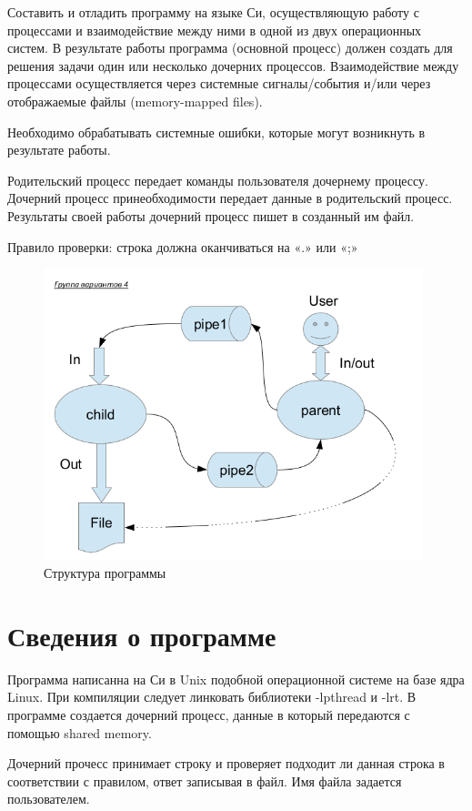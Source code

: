\documentclass[pdf, unicode, 12pt, a4paper,oneside,fleqn]{article}
\begin{document}
Составить и отладить программу на языке Си, осуществляющую работу с процессами 
и взаимодействие между ними в одной из двух операционных систем. В результате работы 
программа (основной процесс) должен создать для решения задачи один или несколько 
дочерних процессов. Взаимодействие между процессами осуществляется через системные 
сигналы/события и/или через отображаемые файлы (memory-mapped files).

Необходимо обрабатывать системные ошибки, которые могут возникнуть в результате работы.

Родительский процесс передает команды пользователя дочернему процессу. Дочерний процесс 
принеобходимости передает данные в родительский процесс. Результаты своей работы дочерний
процесс пишет в созданный им файл.

Правило проверки: строка должна оканчиваться на «.» или «;»

\begin{figure}[htp]
    \centering
    \includegraphics[width=11cm]{os2.png}
    \caption{Структура программы}
    \label{fig:os2}
\end{figure}

\section{Сведения о программе}

Программа написанна на Си в Unix подобной операционной системе на базе ядра Linux.
При компиляции следует линковать библиотеки -lpthread и -lrt.
В программе создается дочерний процесс, данные в который передаются с помощью shared memory.

Дочерний прочесс принимает строку и проверяет подходит ли данная строка в соответствии с правилом, ответ записывая в файл. Имя файла задается пользователем.
\end{document}

